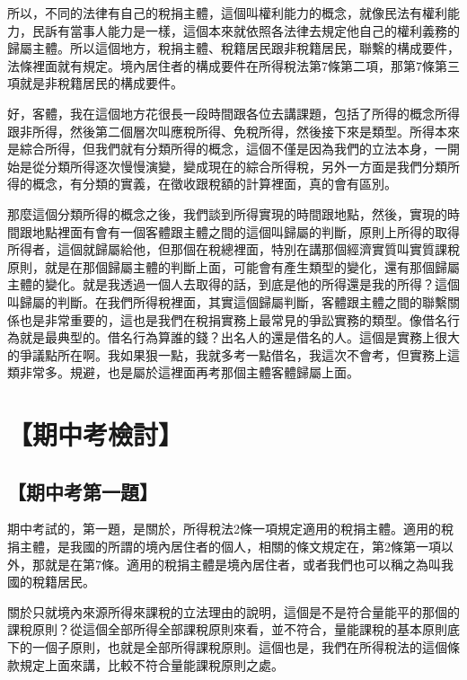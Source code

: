 \documentclass[oneside,sub3section]{ctexbook}
\begin{document}
所以，不同的法律有自己的稅捐主體，這個叫權利能力的概念，就像民法有權利能力，民訴有當事人能力是一樣，這個本來就依照各法律去規定他自己的權利義務的歸屬主體。所以這個地方，稅捐主體、稅籍居民跟非稅籍居民，聯繫的構成要件，法條裡面就有規定。境內居住者的構成要件在所得稅法第7條第二項，那第7條第三項就是非稅籍居民的構成要件。

好，客體，我在這個地方花很長一段時間跟各位去講課題，包括了所得的概念所得跟非所得，然後第二個層次叫應稅所得、免稅所得，然後接下來是類型。所得本來是綜合所得，但我們就有分類所得的概念，這個不僅是因為我們的立法本身，一開始是從分類所得逐次慢慢演變，變成現在的綜合所得稅，另外一方面是我們分類所得的概念，有分類的實義，在徵收跟稅額的計算裡面，真的會有區別。

那麼這個分類所得的概念之後，我們談到所得實現的時間跟地點，然後，實現的時間跟地點裡面有會有一個客體跟主體之間的這個叫歸屬的判斷，原則上所得的取得所得者，這個就歸屬給他，但那個在稅總裡面，特別在講那個經濟實質叫實質課稅原則，就是在那個歸屬主體的判斷上面，可能會有產生類型的變化，還有那個歸屬主體的變化。就是我透過一個人去取得的話，到底是他的所得還是我的所得？這個叫歸屬的判斷。在我們所得稅裡面，其實這個歸屬判斷，客體跟主體之間的聯繫關係也是非常重要的，這也是我們在稅捐實務上最常見的爭訟實務的類型。像借名行為就是最典型的。借名行為算誰的錢？出名人的還是借名的人。這個是實務上很大的爭議點所在啊。我如果狠一點，我就多考一點借名，我這次不會考，但實務上這類非常多。規避，也是屬於這裡面再考那個主體客體歸屬上面。

\hypertarget{ux671fux4e2dux8003ux6aa2ux8a0e}{%
\section{【期中考檢討】}\label{ux671fux4e2dux8003ux6aa2ux8a0e}}

\hypertarget{ux671fux4e2dux8003ux7b2cux4e00ux984c}{%
\subsection{【期中考第一題】}\label{ux671fux4e2dux8003ux7b2cux4e00ux984c}}

期中考試的，第一題，是關於，所得稅法2條一項規定適用的稅捐主體。適用的稅捐主體，是我國的所謂的境內居住者的個人，相關的條文規定在，第2條第一項以外，那就是在第7條。適用的稅捐主體是境內居住者，或者我們也可以稱之為叫我國的稅籍居民。

關於只就境內來源所得來課稅的立法理由的說明，這個是不是符合量能平的那個的課稅原則？從這個全部所得全部課稅原則來看，並不符合，量能課稅的基本原則底下的一個子原則，也就是全部所得課稅原則。這個也是，我們在所得稅法的這個條款規定上面來講，比較不符合量能課稅原則之處。
\end{document}
